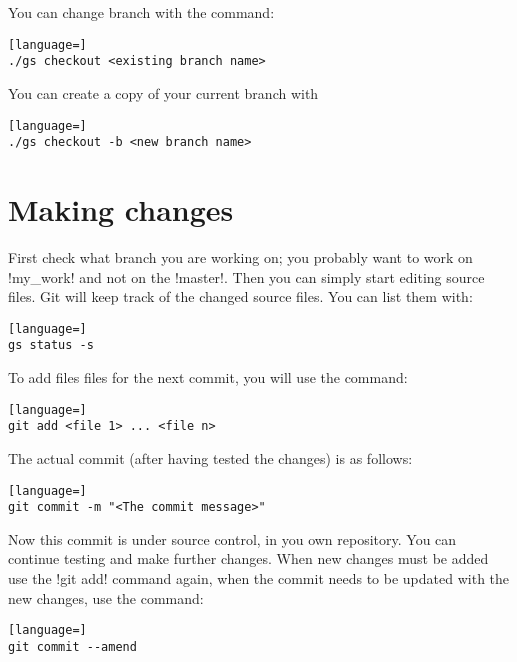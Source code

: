 You can change branch with the command:

\begin{lstlisting}[language=]
./gs checkout <existing branch name>
\end{lstlisting}

You can create a copy of your current branch with

\begin{lstlisting}[language=]
./gs checkout -b <new branch name>
\end{lstlisting}

\section{Making changes \label{sec:git.changing}}

First check what branch you are working on; you probably want to work on
!my_work! and not on the !master!. Then you can simply start editing source
files. Git will keep track of the changed source files. You can list them with:

\begin{lstlisting}[language=]
gs status -s
\end{lstlisting}

\noindent
To add files files for the next commit, you will use the command:


\begin{lstlisting}[language=]
git add <file 1> ... <file n>
\end{lstlisting}

\noindent
The actual commit (after having tested the changes) is as follows:


\begin{lstlisting}[language=]
git commit -m "<The commit message>"
\end{lstlisting}

\noindent
Now this commit is under source control, in you own repository. You can
continue testing and make further changes. When new changes must be added use
the !git add! command again, when the commit needs to be updated with the new
changes, use the command:


\begin{lstlisting}[language=]
git commit --amend
\end{lstlisting}

